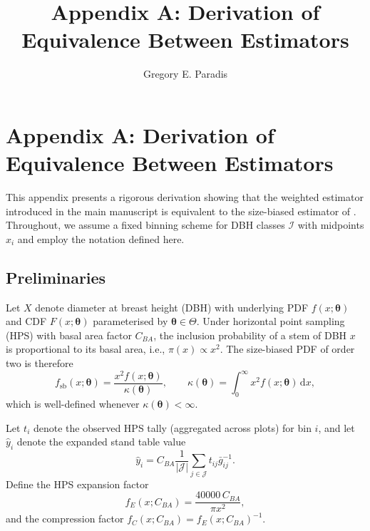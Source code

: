 \documentclass[12pt,letterpaper,leqno]{article}
\title{Appendix A: Derivation of Equivalence Between Estimators}
\author{Gregory E. Paradis}
\date{}
\theoremstyle{plain}
\begin{document}
\doublespacing
\maketitle
\linenumbers

\section*{Appendix A: Derivation of Equivalence Between Estimators}

This appendix presents a rigorous derivation showing that the weighted estimator introduced
in the main manuscript is equivalent to the size-biased estimator of
\citet{van1986, ducey2015}. Throughout, we assume a fixed binning scheme for
DBH classes $\mathcal{I}$ with midpoints $x_i$ and employ the notation defined
here.

\setcounter{equation}{0}
\renewcommand{\theequation}{A\arabic{equation}}
\setcounter{figure}{0}
\renewcommand{\thefigure}{A\arabic{figure}}
\setcounter{table}{0}
\renewcommand{\thetable}{A\arabic{table}}

\subsection*{Preliminaries}

Let $X$ denote diameter at breast height (DBH) with underlying PDF
$f(x;\boldsymbol{\theta})$ and CDF $F(x;\boldsymbol{\theta})$ parameterised by
$\boldsymbol{\theta}\in\Theta$. Under horizontal point sampling (HPS) with basal
area factor $C_{BA}$, the inclusion probability of a stem of DBH $x$ is
proportional to its basal area, i.e., $\pi(x)\propto x^2$. The size-biased PDF
of order two is therefore
\begin{equation}
  f_{\mathrm{sb}}(x;\boldsymbol{\theta})
  =
  \frac{x^{2} f(x;\boldsymbol{\theta})}{\kappa(\boldsymbol{\theta})},
  \qquad
  \kappa(\boldsymbol{\theta})
  =
  \int_{0}^{\infty} x^{2} f(x;\boldsymbol{\theta})\,\mathrm{d}x,
\end{equation}
which is well-defined whenever $\kappa(\boldsymbol{\theta}) < \infty$.

Let $t_i$ denote the observed HPS tally (aggregated across plots) for bin $i$,
and let $\hat{y}_i$ denote the expanded stand table value
\begin{equation}
  \hat{y}_i = C_{BA} \frac{1}{|\mathcal{J}|} \sum_{j \in \mathcal{J}} t_{ij} \bar{g}_{ij}^{-1}.
\end{equation}
Define the HPS expansion factor
\begin{equation}
  f_E(x; C_{BA}) = \frac{40000 \, C_{BA}}{\pi x^2},
\end{equation}
and the compression factor $f_C(x; C_{BA}) = f_E(x; C_{BA})^{-1}$.
\end{document}
